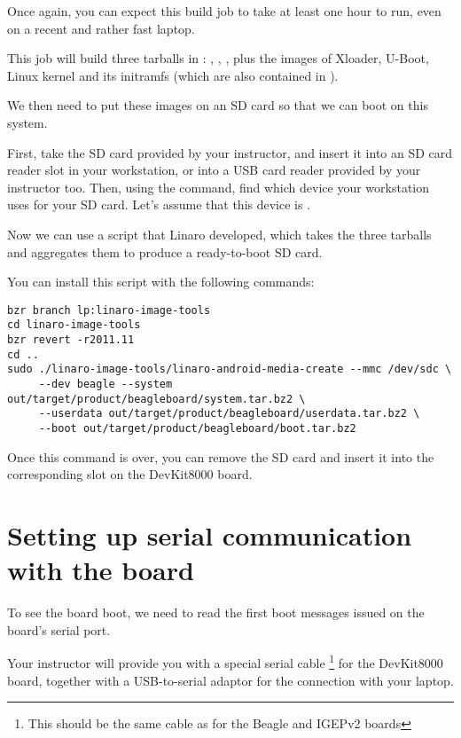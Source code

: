 
Once again, you can expect this build job to take at least one hour to
run, even on a recent and rather fast laptop.

This job will build three tarballs in
: ,
, , plus the images of
Xloader, U-Boot, Linux kernel and its initramfs (which are also
contained in ).

We then need to put these images on an SD card so that we can boot on
this system.

First, take the SD card provided by your instructor, and insert it
into an SD card reader slot in your workstation, or into a USB card
reader provided by your instructor too. Then, using the 
command, find which device your workstation uses for your SD card.
Let's assume that this device is .

Now we can use a  script that Linaro
developed, which takes the three tarballs and aggregates them to
produce a ready-to-boot SD card.

You can install this script with the following commands:

\begin{verbatim}
bzr branch lp:linaro-image-tools
cd linaro-image-tools
bzr revert -r2011.11
cd ..
sudo ./linaro-image-tools/linaro-android-media-create --mmc /dev/sdc \
     --dev beagle --system out/target/product/beagleboard/system.tar.bz2 \
     --userdata out/target/product/beagleboard/userdata.tar.bz2 \
     --boot out/target/product/beagleboard/boot.tar.bz2
\end{verbatim}

Once this command is over, you can remove the SD card and insert it
into the corresponding slot on the DevKit8000 board.

\section{Setting up serial communication with the board}

To see the board boot, we need to read the first boot messages issued
on the board's serial port.

Your instructor will provide you with a special serial cable
\footnote{This should be the same cable as for the Beagle and IGEPv2
  boards} for the DevKit8000 board, together with a USB-to-serial
adaptor for the connection with your laptop.

